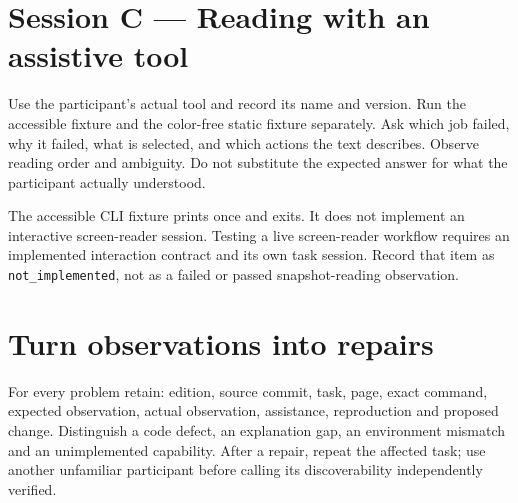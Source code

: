 \section{Session C — Reading with an assistive tool}

Use the participant's actual tool and record its name and version. Run the accessible fixture and the color-free static fixture separately. Ask which job failed, why it failed, what is selected, and which actions the text describes. Observe reading order and ambiguity. Do not substitute the expected answer for what the participant actually understood.

The accessible CLI fixture prints once and exits. It does not implement an interactive screen-reader session. Testing a live screen-reader workflow requires an implemented interaction contract and its own task session. Record that item as \texttt{not\_implemented}, not as a failed or passed snapshot-reading observation.

\section{Turn observations into repairs}

For every problem retain: edition, source commit, task, page, exact command, expected observation, actual observation, assistance, reproduction and proposed change. Distinguish a code defect, an explanation gap, an environment mismatch and an unimplemented capability. After a repair, repeat the affected task; use another unfamiliar participant before calling its discoverability independently verified.
